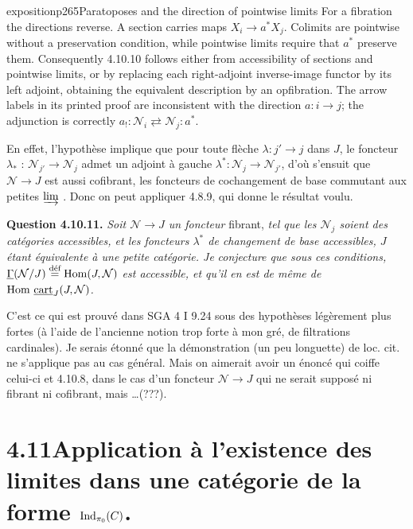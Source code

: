 \begin{dcomment}{exposition}{p265}{Paratoposes and the direction of pointwise limits}
For a fibration the directions reverse. A section carries maps $X_i\to a^*X_j$. Colimits are pointwise without a preservation condition, while pointwise limits require that $a^*$ preserve them. Consequently 4.10.10 follows either from accessibility of sections and pointwise limits, or by replacing each right-adjoint inverse-image functor by its left adjoint, obtaining the equivalent description by an opfibration. The arrow labels in its printed proof are inconsistent with the direction $a:i\to j$; the adjunction is correctly $a_!:\mathcal N_i\rightleftarrows\mathcal N_j:a^*$.
\end{dcomment}


En effet, l'hypothèse implique que pour toute flèche $\lambda : j' \longrightarrow j$ dans $J$, le foncteur $\lambda_*$ : $\mathcal{N}_{j'} \longrightarrow \mathcal{N}_j$ admet un adjoint à gauche $\lambda^* : \mathcal{N}_j \longrightarrow \mathcal{N}_{j'}$, d'où s'ensuit que $\mathcal{N} \longrightarrow J$ est aussi cofibrant, les foncteurs de cochangement de base commutant aux petites $\varinjlim$ . Donc on peut appliquer 4.8.9, qui donne le résultat voulu.

\textbf{Question 4.10.11.} \textit{Soit $\mathcal{N} \longrightarrow J$ un foncteur} fibrant, \textit{tel que les $\mathcal{N}_j$ soient des catégories accessibles, et les foncteurs $\lambda^*$ de changement de base accessibles, $J$ étant équivalente à une petite catégorie. Je}  \textit{conjecture que sous ces conditions, $\uGamma(\mathcal{N}/J) \defeq \Hom(J,\mathcal{N})$ est accessible, et qu'il en est de même de $\Hom\,\underline{\operatorname{cart}}_J(J,\mathcal{N})$.}

C'est ce qui est prouvé dans SGA 4 I 9.24 sous des hypothèses légèrement plus fortes (à l'aide de l'ancienne notion trop forte à mon gré, de filtrations cardinales). Je serais étonné que la démonstration (un peu longuette) de loc. cit. ne s'applique pas au cas général. Mais on aimerait avoir un énoncé qui coiffe celui-ci et 4.10.8, dans le cas d'un foncteur $\mathcal{N} \longrightarrow J$ qui ne serait supposé ni fibrant ni cofibrant, mais \ldots(???).

\section*{4.11\quad Application à l'existence des limites dans une catégorie de la forme $\Ind_{\pi_0}(C)$.}

